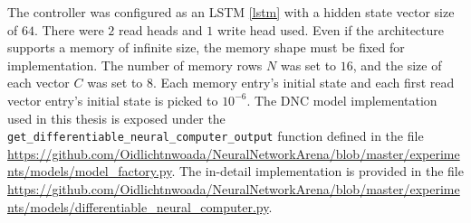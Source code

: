 \documentclass[draft,final]{vutinfth} %
\begin{document}
    The controller was configured as an LSTM \ref{lstm} with a hidden state vector size of $64$. There were $2$ read heads and $1$ write head used.
    Even if the architecture supports a memory of infinite size, the memory shape must be fixed for implementation.
    The number of memory rows $N$ was set to $16$, and the size of each vector $C$ was set to $8$.
    Each memory entry's initial state and each first read vector entry’s initial state is picked to $10^{-6}$. 
    The DNC model implementation used in this thesis is exposed under the \texttt{get\_differentiable\_neural\_computer\_output} function defined in the file \url{https://github.com/Oidlichtnwoada/NeuralNetworkArena/blob/master/experiments/models/model_factory.py}.
    The in-detail implementation is provided in the file \url{https://github.com/Oidlichtnwoada/NeuralNetworkArena/blob/master/experiments/models/differentiable_neural_computer.py}.
\end{document}
